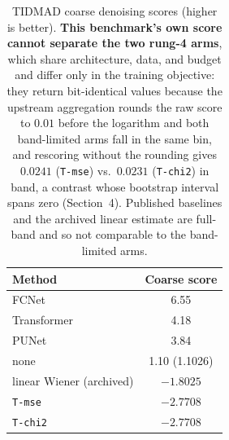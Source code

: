 \begin{table}[t]
  \centering
  \caption{TIDMAD coarse denoising scores (higher is better). \textbf{This
  benchmark's own score cannot separate the two rung-4 arms}, which share
  architecture, data, and budget and differ only in the training objective:
  they return bit-identical values because the upstream aggregation rounds the
  raw score to $0.01$ before the logarithm and both band-limited arms fall in
  the same bin, and rescoring without the rounding gives $0.0241$
  (\texttt{T-mse}) vs.\ $0.0231$ (\texttt{T-chi2}) in band, a contrast whose
  bootstrap interval spans zero (Section~4). Published baselines
  \citep{fry2024tidmad} and the archived linear estimate are full-band and so
  not comparable to the band-limited arms.}
  \label{tab:rung4}
  \small
  \setlength{\tabcolsep}{5pt}
  \begin{tabular}{lc}
    \toprule
    Method & Coarse score \\
    \midrule
    FCNet & 6.55 \\
    Transformer & 4.18 \\
    PUNet & 3.84 \\
    none & 1.10 (1.1026) \\
    linear Wiener (archived) & $-1.8025$ \\
    \texttt{T-mse} & $-2.7708$ \\
    \texttt{T-chi2} & $-2.7708$ \\
    \bottomrule
  \end{tabular}
\end{table}
